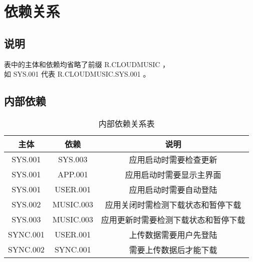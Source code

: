 \chapter{依赖关系}

\section{说明}

    表中的主体和依赖均省略了前缀 R.CLOUDMUSIC ，\\
    如 SYS.001 代表 R.CLOUDMUSIC.SYS.001 。

\section{内部依赖}
\begin{table}[h]
    \caption {内部依赖关系表}
    \begin{tabular}{|c|c|c|}
        \hline
        主体 & 依赖 & 说明\\
        \hline
        SYS.001 & SYS.003 & 应用启动时需要检查更新\\
        \hline
        SYS.001 & APP.001 & 应用启动时需要显示主界面\\
        \hline
        SYS.001 & USER.001 & 应用启动时需要自动登陆\\
        \hline
        SYS.002 & MUSIC.003 & 应用关闭时需检测下载状态和暂停下载\\
        \hline
        SYS.003 & MUSIC.003 & 应用更新时需要检测下载状态和暂停下载\\
        \hline
        SYNC.001 & USER.001 & 上传数据需要用户先登陆\\
        \hline
        SYNC.002 & SYNC.001 & 需要上传数据后才能下载\\
        \hline
    \end{tabular}
\end{table}

